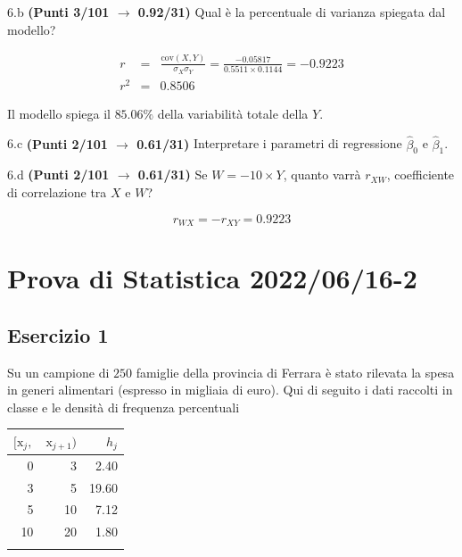 \documentclass[
  11pt,
]{book}
\theoremstyle{mytheoremstyle}
\theoremstyle{mydefstyle}
\newenvironment{sol}
  {
  \begin{tcolorbox}[enhanced,breakable,arc=0.1mm,boxrule=1pt,colback=white,colframe=iblue,
  title=\bf \fontfamily{lmss}\selectfont \hspace{.5 cm} Soluzione,drop fuzzy shadow]

}{
\end{tcolorbox}
  }
\begin{document}
6.b \textbf{(Punti 3/101 \(\rightarrow\) 0.92/31)} Qual è la percentuale di varianza spiegata dal modello?

\begin{sol}
\begin{eqnarray*}
r&=&\frac{\text{cov}(X,Y)}{\sigma_X\sigma_Y}=\frac{ -0.05817 }{ 0.5511 \times 0.1144 }= -0.9223 \\ 
r^2&=& 0.8506\end{eqnarray*}

Il modello spiega il \(85.06\%\) della variabilità totale della \(Y\).

\end{sol}

6.c \textbf{(Punti 2/101 \(\rightarrow\) 0.61/31)} Interpretare i parametri di regressione \(\hat\beta_0\) e \(\hat\beta_1\).

6.d \textbf{(Punti 2/101 \(\rightarrow\) 0.61/31)} Se \(W=-10\times Y\), quanto varrà \(r_{XW}\), coefficiente di correlazione tra \(X\) e \(W\)?

\begin{sol}
\[r_{WX}=-r_{XY}=0.9223\]

\end{sol}

\section{Prova di Statistica 2022/06/16-2}\label{prova-di-statistica-20220616-2}

\subsection{Esercizio 1}\label{esercizio-1-11}

Su un campione di \(250\) famiglie della provincia di Ferrara è stato rilevata la spesa in generi alimentari (espresso in migliaia di euro). Qui di seguito i dati raccolti in classe e le densità di frequenza percentuali

\begin{table}[H]
\centering
\begin{tabular}{rrr}
\toprule
$[\text{x}_j,$ & $\text{x}_{j+1})$ & $h_j$\\
\midrule
0 & 3 & 2.40\\
3 & 5 & 19.60\\
5 & 10 & 7.12\\
10 & 20 & 1.80\\
 &  & \\
\bottomrule
\end{tabular}
\end{table}
\end{document}
